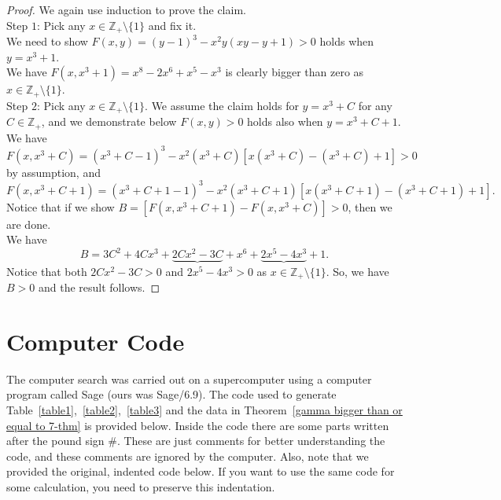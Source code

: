 \documentclass[11pt,reqno]{amsart}
\begin{document}
\begin{proof}
We again use induction to prove the claim.\\
Step $1$: Pick any $x \in \mathbb{Z}_{+} \setminus \{1\}$ and fix it.\\
We need to show $F(x,y)=(y-1)^3-x^{2}y(xy-y+1)>0$ holds when $y=x^3+1$.\\
We have $F(x,x^3+1)=x^8-2x^6+x^5-x^3$ is clearly bigger than zero as $x \in \mathbb{Z}_{+} \setminus \{1\}$.\\
Step $2$: Pick any $x \in \mathbb{Z}_{+} \setminus \{1\}$. We assume the claim holds for $y=x^3+C$ for any $C \in \mathbb{Z}_{+}$, and we demonstrate below $F(x,y)>0$ holds also when $y=x^3+C+1.$\\
We have \[F(x,x^3+C)=(x^{3}+C-1)^3-x^2(x^3+C) [x(x^3+C)-(x^3+C)+1]>0\] by assumption, and 
\[F(x,x^3+C+1)=(x^{3}+C+1-1)^3-x^{2}(x^3+C+1)[x(x^{3}+C+1)-(x^{3}+C+1)+1].\]
Notice that if we show $B=[F(x,x^3+C+1)-F(x,x^3+C)]>0$, then we are done.\\
We have
\[B= 3 C^{2} + 4 C x^{3} + \underbrace{2 C x^2 - 3 C} + x^6 + \underbrace{2 x^5 - 4 x^3}+1.\]
Notice that both $2 C x^2 - 3 C>0$ and $2 x^5 - 4 x^3>0$ as $x \in \mathbb{Z}_{+} \setminus \{1\}$. So, we have $B>0$ and the result follows.
\end{proof}

\section{Computer Code}
The computer search was carried out on a supercomputer using a computer program called Sage (ours was Sage/6.9). The code used to generate Table~\ref{table1},~\ref{table2},~\ref{table3} and the data in Theorem~\ref{gamma bigger than or equal to 7-thm} is provided below. Inside the code there are some parts written after the pound sign $\#$. These are just comments for better understanding the code, and these comments are ignored by the computer. Also, note that we provided the original, indented code below. If you want to use the same code for some calculation, you need to preserve this indentation.
\end{document}
